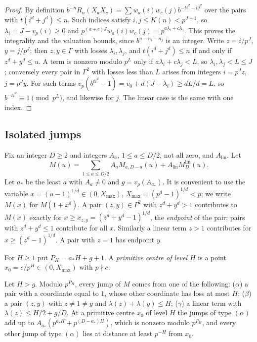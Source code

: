 \documentclass[11pt]{article}
\begin{document}
\begin{proof}
By definition $b^{-n}R_n(X_aX_c)=\sum w_a(i)w_c(j)b^{-ti^d-tj^d}$ over the pairs with $t(i^d+j^d)\le n$.
Such indices satisfy $i,j\le K(n)<p^{J+1}$, so $\lambda_i=J-v_p(i)\ge0$ and
$p^{(a+c)J}w_a(i)w_c(j)=p^{a\lambda_i+c\lambda_j}$. This proves the integrality and the valuation bounds,
since $b^{n-n_i-n_j}$ is an integer. Write $z=i/p^J$, $y=j/p^J$; then $z,y\in\Gamma$ with losses
$\lambda_i,\lambda_j$, and $t(i^d+j^d)\le n$ if and only if $z^d+y^d\le u$. A term is nonzero modulo $p^L$
only if $a\lambda_i+c\lambda_j<L$, so $\lambda_i,\lambda_j<L\le J$; conversely every pair in $\Gamma^2$ with
losses less than $L$ arises from integers $i=p^Jz$, $j=p^Jy$. For such terms
$v_p(b^{ti^d}-1)=v_0+d(J-\lambda_i)\ge dL/d=L$, so $b^{-ti^d}\equiv1\pmod{p^L}$, and likewise for $j$.
The linear case is the same with one index.
\end{proof}

\subsection{Isolated jumps}

Fix an integer $D\ge2$ and integers $A_a$, $1\le a\le D/2$, not all zero, and $A_{\mathrm{lin}}$. Let
\[
M(u)=\sum_{1\le a\le D/2}A_aM_{a,D-a}(u)+A_{\mathrm{lin}}M^{\mathrm{lin}}_D(u).
\]
Let $a_*$ be the least $a$ with $A_a\ne0$ and $g=v_p(A_{a_*})$. It is convenient to use the variable
$x=(u-1)^{1/d}\in(0,X_{\max})$, $X_{\max}=(p^d-1)^{1/d}<p$; we write $M(x)$ for $M(1+x^d)$. A pair
$(z,y)\in\Gamma^2$ with $z^d+y^d>1$ contributes to $M(x)$ exactly for $x\ge x_{z,y}=(z^d+y^d-1)^{1/d}$, the
\emph{endpoint} of the pair; pairs with $z^d+y^d\le1$ contribute for all $x$. Similarly a linear term
$z>1$ contributes for $x\ge(z^d-1)^{1/d}$. A pair with $z=1$ has endpoint $y$.

For $H\ge1$ put $P_H=a_*H+g+1$. A \emph{primitive centre of level $H$} is a point $x_0=c/p^H\in(0,X_{\max})$
with $p\nmid c$.

\begin{lemma}\label{lem:primjump}
Let $H>g$. Modulo $p^{P_H}$, every jump of $M$ comes from one of the following: \textup{($\alpha$)} a pair
with a coordinate equal to $1$, whose other coordinate has loss at most $H$; \textup{($\beta$)} a pair
$(z,y)$ with $z\ne1\ne y$ and $\lambda(z)+\lambda(y)\le H$; \textup{($\gamma$)} a linear term with
$\lambda(z)\le H/2+g/D$. At a primitive centre $x_0$ of level $H$ the jumps of type $(\alpha)$ add up to
$A_{a_*}(p^{a_*H}+p^{(D-a_*)H})$, which is nonzero modulo $p^{P_H}$, and every other jump of type
$(\alpha)$ lies at distance at least $p^{-H}$ from $x_0$.
\end{lemma}
\end{document}
